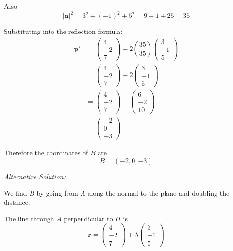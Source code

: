 \documentclass[leqno]{article}
\begin{document}
\begin{enumerate}[
  label=\textbf{\arabic*.},
  leftmargin=*,
  topsep=0pt,
  partopsep=0pt,
  parsep=0pt
]
\begin{djsSolution}
Also
\[
|\mathbf n|^2=3^2+(-1)^2+5^2=9+1+25=35
\]

Substituting into the reflection formula:
\begin{align*}
\mathbf p'
&=\begin{pmatrix}4\\-2\\7\end{pmatrix}-2\left(\dfrac{35}{35}\right)\begin{pmatrix}3\\-1\\5\end{pmatrix}\\
&=\begin{pmatrix}4\\-2\\7\end{pmatrix}-2\begin{pmatrix}3\\-1\\5\end{pmatrix}\\
&=\begin{pmatrix}4\\-2\\7\end{pmatrix}-\begin{pmatrix}6\\-2\\10\end{pmatrix}\\
&=\begin{pmatrix}-2\\0\\-3\end{pmatrix}
\end{align*}

Therefore the coordinates of \(B\) are
\[
B=(-2,0,-3)
\]

{\setlength{\parskip}{8pt}%
\textit{Alternative Solution:}

We find \(B\) by going from \(A\) along the normal to the plane and doubling the distance.

The line through \(A\) perpendicular to \(\Pi\) is
\[
\mathbf r=\begin{pmatrix}4\\-2\\7\end{pmatrix}+\lambda\begin{pmatrix}3\\-1\\5\end{pmatrix}
\]

}
\end{djsSolution}
\end{enumerate}
\end{document}
